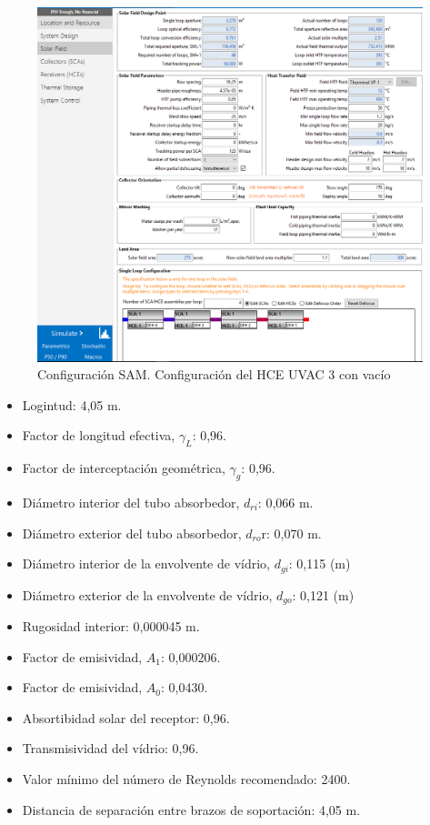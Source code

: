 \begin{figure}
\includegraphics[width=0.9\linewidth]{images/captura_sam_iph03.png}
\caption{Configuración SAM. Configuración del HCE UVAC 3 con vacío}
\label{fig:captura04}
\end{figure}


\begin{itemize}[itemsep=2pt,parsep=2pt]
\item
  Logintud: 4,05 m.
\item
  Factor de longitud efectiva, \(\gamma_L\): 0,96.
\item
  Factor de interceptación geométrica, \(\gamma_g\): 0,96.
\item
  Diámetro interior del tubo absorbedor, \(d_{ri}\): 0,066 m.
\item
  Diámetro exterior del tubo absorbedor, \(d_{ro}\)r: 0,070 m.
\item
  Diámetro interior de la envolvente de vídrio, \(d_{gi}\): 0,115 (m)
\item
  Diámetro exterior de la envolvente de vídrio, \(d_{go}\): 0,121 (m)
\item
  Rugosidad interior: 0,000045 m.
\item
  Factor de emisividad, \(A_1\): 0,000206.
\item
  Factor de emisividad, \(A_0\): 0,0430.
\item
  Absortibidad solar del receptor: 0,96.
\item
  Transmisividad del vídrio: 0,96.
\item
  Valor mínimo del número de Reynolds recomendado: 2400.
\item
  Distancia de separación entre brazos de soportación: 4,05 m.
\end{itemize}

